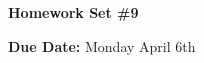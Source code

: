 


\thispagestyle{fancy}






\begin{center}
{\huge \textbf{Homework Set \#9 }}
\large

{\textbf{ Due Date:} Monday April 6th  } 
\end{center}

